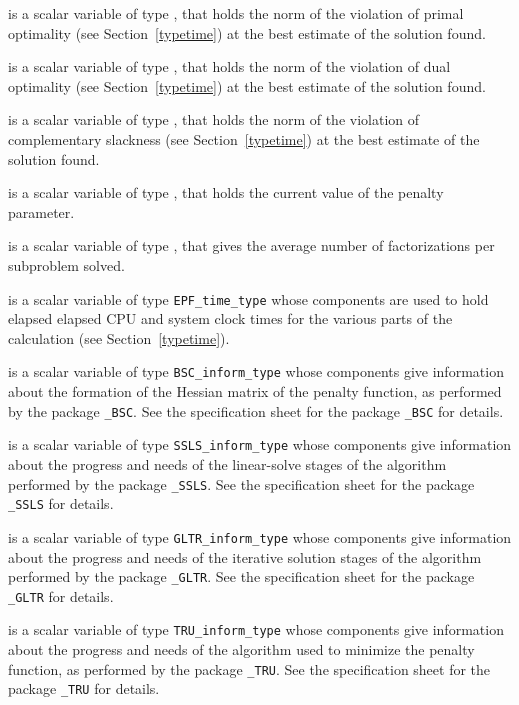 \documentclass{galahad}
\newcommand{\packagename}{EPF}
\begin{document}
\begin{description}
 is a scalar variable of type \realdp,
that holds the norm of the violation of primal optimality
(see Section~\ref{typetime}) at the best estimate of the solution found.

 is a scalar variable of type \realdp,
that holds the norm of the violation of dual optimality
(see Section~\ref{typetime}) at the best estimate of the solution found.

is a scalar variable of type \realdp,
that holds the norm of the violation of complementary slackness
(see Section~\ref{typetime}) at the best estimate of the solution found.

 is a scalar variable of type \realdp, that holds
the current value of the penalty parameter.

 is a scalar variable of type \realdp, that
gives the average number of factorizations per subproblem solved.

 is a scalar variable of type {\tt \packagename\_time\_type}
whose components are used to hold elapsed elapsed CPU and system clock
times for the various parts of the calculation (see Section~\ref{typetime}).

 is a scalar variable of type
{\tt BSC\_inform\_type}
whose components give information about the formation of the Hessian matrix
of the penalty function, as performed by the package
{\tt \libraryname\_BSC}.
See the specification sheet for the package
{\tt \libraryname\_BSC}
for details.

 is a scalar variable of type
{\tt SSLS\_inform\_type}
whose components give information about the progress and needs
of the linear-solve stages of the algorithm performed by the package
{\tt \libraryname\_SSLS}.
See the specification sheet for the package
{\tt \libraryname\_SSLS}
for details.

 is a scalar variable of type
{\tt GLTR\_inform\_type}
whose components give information about the progress and needs
of the iterative solution stages of the algorithm performed by the package
{\tt \libraryname\_GLTR}.
See the specification sheet for the package
{\tt \libraryname\_GLTR}
for details.

 is a scalar variable of type
{\tt TRU\_inform\_type}
whose components give information about the progress and needs
of the algorithm used to minimize the penalty function, as performed
by the package
{\tt \libraryname\_TRU}.
See the specification sheet for the package
{\tt \libraryname\_TRU}
for details.

\end{description}
\end{document}

